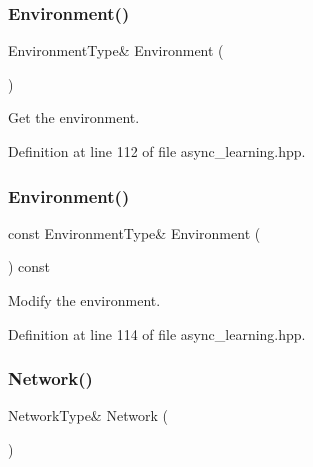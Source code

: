\subsubsection{Environment()\hspace{0.1cm}{\footnotesize\ttfamily [1/2]}}
{\footnotesize\ttfamily Environment\+Type\& Environment (\begin{DoxyParamCaption}{ }\end{DoxyParamCaption})\hspace{0.3cm}{\ttfamily [inline]}}



Get the environment. 



Definition at line 112 of file async\+\_\+learning.\+hpp.

\mbox{\label{classmlpack_1_1rl_1_1AsyncLearning_adc517fd7b152925b4297e09a3bb4afe0}} 
\subsubsection{Environment()\hspace{0.1cm}{\footnotesize\ttfamily [2/2]}}
{\footnotesize\ttfamily const Environment\+Type\& Environment (\begin{DoxyParamCaption}{ }\end{DoxyParamCaption}) const\hspace{0.3cm}{\ttfamily [inline]}}



Modify the environment. 



Definition at line 114 of file async\+\_\+learning.\+hpp.

\mbox{\label{classmlpack_1_1rl_1_1AsyncLearning_a3802bdee893a3f86fb9fa08cbbc8239c}} 
\subsubsection{Network()\hspace{0.1cm}{\footnotesize\ttfamily [1/2]}}
{\footnotesize\ttfamily Network\+Type\& Network (\begin{DoxyParamCaption}{ }\end{DoxyParamCaption})\hspace{0.3cm}{\ttfamily [inline]}}



